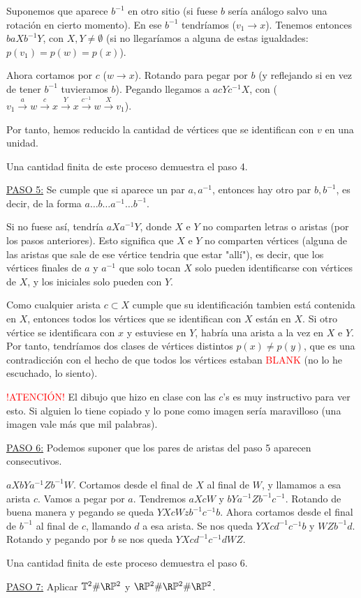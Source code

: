 {    \noindent Suponemos que aparece $b^{-1}$ en otro sitio (si fuese $b$ sería análogo salvo una rotación en cierto momento). En ese $b^{-1}$ tendríamos ($v_1 \to x$). Tenemos entonces $baXb^{-1}Y$, con $X,Y \ne \emptyset$ (si no llegaríamos a alguna de estas igualdades: $p(v_1)=p(w)=p(x)$).
    
    \noindent Ahora cortamos por $c$ ($w \to x$). Rotando para pegar por $b$ (y reflejando si en vez de tener $b^{-1}$ tuvieramos $b$). Pegando llegamos a $acYc^{-1}X$, con ($v_1 \overset{a}{\to} w \overset{c}{\to} x \overset{Y}{\to} x \overset{c^{-1}}{\to} w \overset{X}{\to} v_1$).

    \noindent Por tanto, hemos reducido la cantidad de vértices que se identifican con $v$ en una unidad.

    \noindent Una cantidad finita de este proceso demuestra el paso 4.

    \noindent \underline{PASO 5:} Se cumple que si aparece un par $a, a^{-1}$, entonces hay otro par $b, b^{-1}$, es decir, de la forma $a\dots b\dots a^{-1} \dots b^{-1}$.

    \noindent Si no fuese así, tendría $aXa^{-1}Y$, donde $X$ e $Y$ no comparten letras o aristas (por los pasos anteriores). Esto significa que $X$ e $Y$ no comparten vértices (alguna de las aristas que sale de ese vértice tendria que estar "allí"), es decir, que los vértices finales de $a$ y $a^{-1}$ que solo tocan $X$ solo pueden identificarse con vértices de $X$, y los iniciales solo pueden con $Y$.

    \noindent Como cualquier arista $c \subset X$ cumple que su identificación tambien está contenida en $X$, entonces todos los vértices que se identifican con $X$ están en $X$. Si otro vértice se identificara con $x$ y estuviese en $Y$, habría una arista a la vez en $X$ e $Y$. Por tanto, tendríamos dos clases de vértices distintos $p(x) \ne p(y)$, que es una contradicción con el hecho de que todos los vértices estaban \textcolor{red}{BLANK} (no lo he escuchado, lo siento).

    \noindent \textcolor{red}{!ATENCIÓN!} El dibujo que hizo en clase con las $c$'s es muy instructivo para ver esto. Si alguien lo tiene copiado y lo pone como imagen sería maravilloso (una imagen vale más que mil palabras).

    \noindent \underline{PASO 6:} Podemos suponer que los pares de aristas del paso 5 aparecen consecutivos. 

    \noindent $aXbYa^{-1}Zb^{-1}W$. Cortamos desde el final de $X$ al final de $W$, y llamamos a esa arista $c$. Vamos a pegar por $a$. Tendremos $aXcW$ y $bYa^{-1}Zb^{-1}c^{-1}$. Rotando de buena manera y pegando se queda $YXcWzb^{-1}c^{-1}b$. Ahora cortamos desde el final de $b^{-1}$ al final de $c$, llamando $d$ a esa arista. Se nos queda $YXcd^{-1}c^{-1}b$ y $WZb^{-1}d$. Rotando y pegando por $b$ se nos queda $YXcd^{-1}c^{-1}dWZ$. 

    \noindent Una cantidad finita de este proceso demuestra el paso 6.

    \noindent \underline{PASO 7:} Aplicar $\mathbb{T}^2\#\R \mathbb{P}^2$ y $\R \mathbb{P}^2\#\R \mathbb{P}^2\#\R \mathbb{P}^2$.
}
